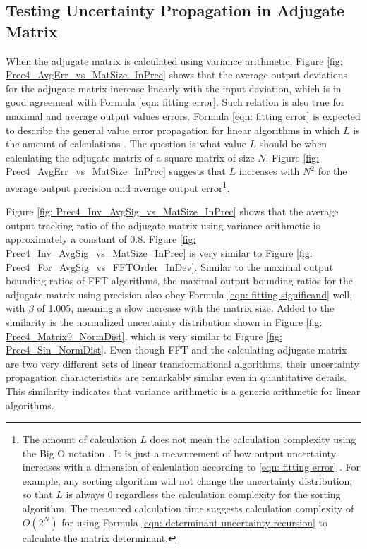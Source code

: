 \documentclass[twoside]{article}
\numberwithin{equation}{section}
\begin{document}
\subsection{Testing Uncertainty Propagation in Adjugate Matrix}

When the adjugate matrix is calculated using variance arithmetic, Figure \ref{fig: Prec4_AvgErr_vs_MatSize_InPrec} shows that the average output deviations for the adjugate matrix increase linearly with the input deviation, which is in good agreement with Formula \eqref{eqn: fitting error}.  Such relation is also true for maximal and average output values errors.  Formula \eqref{eqn: fitting error} is expected to describe the general value error propagation for linear algorithms in which $L$ is the amount of calculations \cite{Chaotic_Dynamics}.  The question is what value $L$ should be when calculating the adjugate matrix of a square matrix of size $N$.  Figure \ref{fig: Prec4_AvgErr_vs_MatSize_InPrec} suggests that $L$ increases with $N^{2}$ for the average output precision and average output error\footnote{The amount of calculation $L$ does not mean the calculation complexity using the Big O notation \cite{Big_O_Notation}.  It is just a measurement of how output uncertainty increases with a dimension of calculation according to \eqref{eqn: fitting error} \cite{Chaotic_Dynamics}. For example, any sorting algorithm will not change the uncertainty distribution, so that $L$ is always 0 regardless the calculation complexity for the sorting algorithm. The measured calculation time suggests calculation complexity of $O(2^N)$ for using Formula \eqref{eqn: determinant uncertainty recursion} to calculate the matrix determinant.}. 

Figure \ref{fig: Prec4_Inv_AvgSig_vs_MatSize_InPrec} shows that the average output tracking ratio of the adjugate matrix using variance arithmetic is approximately a constant of 0.8.  Figure \ref{fig: Prec4_Inv_AvgSig_vs_MatSize_InPrec} is very similar to Figure \ref{fig: Prec4_For_AvgSig_vs_FFTOrder_InDev}.  Similar to the maximal output bounding ratios of FFT algorithms, the maximal output bounding ratios for the adjugate matrix using precision also obey Formula \eqref{eqn: fitting significand} well, with $\beta$ of 1.005, meaning a slow increase with the matrix size.  Added to the similarity is the normalized uncertainty distribution shown in Figure \ref{fig: Prec4_Matrix9_NormDist}, which is very similar to Figure \ref{fig: Prec4_Sin_NormDist}.  Even though FFT and the calculating adjugate matrix are two very different sets of linear transformational algorithms, their uncertainty propagation characteristics are remarkably similar even in quantitative details.  This similarity indicates that variance arithmetic is a generic arithmetic for linear algorithms.
\end{document}
